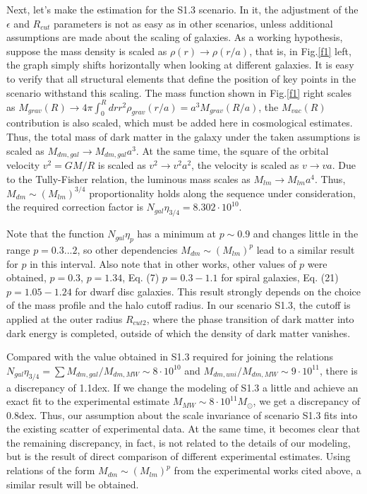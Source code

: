 \documentclass{article}
\begin{document}
Next, let's make the estimation for the S1.3 scenario. In it, the adjustment of the $ \epsilon $ and $ R_ {cut} $ parameters is not as easy as in other scenarios, unless additional assumptions are made about the scaling of galaxies. As a working hypothesis, suppose the mass density is scaled as $ \rho (r) \to \rho (r / a) $, that is, in Fig.\ref {f1} left, the graph simply shifts horizontally when looking at different galaxies. It is easy to verify that all structural elements that define the position of key points in the scenario withstand this scaling. The mass function shown in Fig.\ref {f1} right scales as $ M_ {grav} (R) \to4 \pi \int_0 ^ R dr r ^ 2 \rho_ {grav} (r/a) = a ^ 3M_ {grav} (R / a) $, the $ M_ {vac} (R) $ contribution is also scaled, which must be added here in cosmological estimates. Thus, the total mass of dark matter in the galaxy under the taken assumptions is scaled as $ M_ {dm, gal} \to M_ {dm, gal} a ^ 3 $. At the same time, the square of the orbital velocity $ v ^ 2 = GM / R $ is scaled as $ v ^ 2 \to v ^ 2a ^ 2 $, the velocity is scaled as $ v \to va $. Due to the Tully-Fisher relation, the luminous mass scales as $ M_ {lm} \to M_ {lm} a ^ 4 $. Thus, $ M_ {dm} \sim (M_ {lm}) ^ {3/4} $ proportionality holds along the sequence under consideration, the required correction factor is $ N_ {gal} \eta_ {3/4} = 8.302 \cdot10 ^ { 10} $.

Note that the function $ N_ {gal} \eta_p $ has a minimum at $ p \sim0.9 $ and changes little in the range $ p = 0.3 ... 2 $, so other dependencies $ M_ {dm} \sim (M_ { lm}) ^ p $ lead to a similar result for $ p $ in this interval. Also note that in other works, other values of $ p $ were obtained, \cite {astro-ph/9304018} $ p = 0.3 $, \cite {Girardi_2002_ApJ_569_720} $ p = 1.34 $, \cite {astro-ph/0703115 } Eq. (7) $ p = 0.3-1.1 $ for spiral galaxies, \cite {1609.06903} Eq. (21) $ p = 1.05-1.24 $ for dwarf disc galaxies. This result strongly depends on the choice of the mass profile and the halo cutoff radius. In our scenario S1.3, the cutoff is applied at the outer radius $ R_ {cut2} $, where the phase transition of dark matter into dark energy is completed, outside of which the density of dark matter vanishes.

Compared with the value obtained in S1.3 required for joining the relations $ N_ {gal} \eta_ {3/4} = \sum M_ {dm, gal} / M_ {dm, MW} \sim8 \cdot10 ^ {10} $ and $ M_ {dm, uni} / M_ {dm, MW} \sim9 \cdot10 ^ {11} $, there is a discrepancy of 1.1dex. If we change the modeling of S1.3 a little and achieve an exact fit to the experimental estimate \cite {1405.0306} $ M_ {MW} \sim 8 \cdot10 ^ {11} M_ \odot $, we get a discrepancy of 0.8dex. Thus, our assumption about the scale invariance of scenario S1.3 fits into the existing scatter of experimental data. At the same time, it becomes clear that the remaining discrepancy, in fact, is not related to the details of our modeling, but is the result of direct comparison of different experimental estimates. Using relations of the form $ M_ {dm} \sim (M_ {lm}) ^ p $ from the experimental works cited above, a similar result will be obtained.
\end{document}
